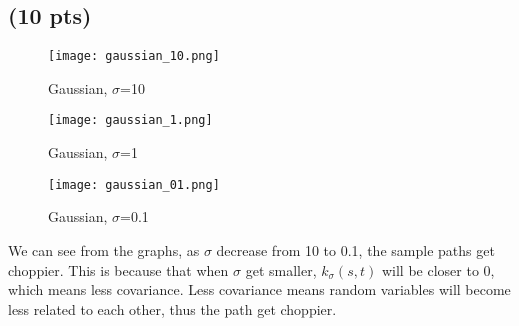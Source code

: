\documentclass{article}
\begin{document}
\subsection{(10 pts)}
\begin{figure}[hbt]
	\begin{minipage}[b]{.33\textwidth}\centering
		\texttt{[image: gaussian\_10.png]}
		\caption{Gaussian, $\sigma$=10}\label{gaussian_10}
	\end{minipage}
	\begin{minipage}[b]{.33\textwidth}\centering
		\texttt{[image: gaussian\_1.png]}
		\caption{Gaussian, $\sigma$=1}\label{gaussian_1}
	\end{minipage}
	\begin{minipage}[b]{.33\textwidth}\centering
		\texttt{[image: gaussian\_01.png]}
		\caption{Gaussian, $\sigma$=0.1}\label{gaussian_01}
	\end{minipage}
\end{figure}
We can see from the graphs, as $\sigma$ decrease from 10 to 0.1, the sample paths get choppier. This is because that when $\sigma$ get smaller, $k_{\sigma}(s,t)$ will be closer to 0, which means less covariance. Less covariance means random variables will become less related to each other, thus the path get choppier.
\end{document}
